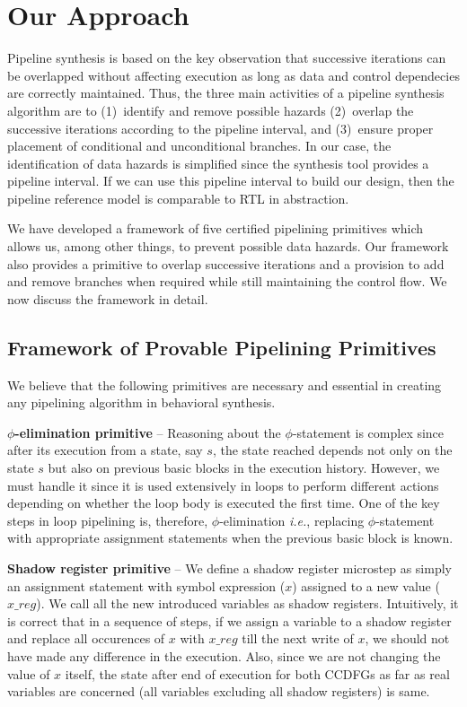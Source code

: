 \section{Our Approach}
\label{sec:pipelining-algorithm}

Pipeline synthesis is based on the key observation that
successive iterations can be overlapped without affecting execution as long
as data and control dependecies are correctly maintained. 
Thus, the three main
activities of a pipeline synthesis algorithm are to
(1)~identify and remove possible hazards (2)~overlap the
successive iterations according to the pipeline interval, and 
(3)~ensure proper placement of conditional and unconditional branches. In our case,
the identification of data hazards is simplified since the synthesis tool
provides a pipeline interval. If we can use this pipeline interval to build our design, 
then the pipeline reference model is comparable to RTL in abstraction. 

We have developed a framework of five certified pipelining
primitives which allows us, among other things, to prevent possible data
hazards. Our framework also provides a primitive
to overlap successive iterations and a provision to add and remove 
branches when required while still maintaining the control flow. We now discuss
the framework in detail.

\subsection{Framework of Provable Pipelining Primitives}

We believe that the following primitives are necessary and essential in creating any pipelining
algorithm in behavioral synthesis.

{\textbf {$\phi$-elimination primitive}} -- 
Reasoning about the $\phi$-statement is complex since after its
execution from a state, say $s$, the state reached depends not only
on the state $s$ but also on previous basic blocks in the execution history.
However, we must handle it since it is used extensively in
loops to perform different actions depending on whether the
loop body is executed the first time. One of the key steps in loop pipelining is,
therefore, $\phi$-elimination {\em i.e.}, replacing
$\phi$-statement with appropriate assignment statements when the previous basic block is known.

{\textbf {Shadow register primitive}} -- We define a shadow register microstep as simply an assignment
statement with symbol expression ($x$) assigned to a new value ($x\_reg$). We call all the new introduced 
variables as shadow registers. Intuitively, it is correct that in a sequence of steps, if we assign a variable 
to a shadow register and replace all occurences of $x$ with $x\_reg$
till the next write of $x$, we should
not have made any difference in the execution. Also, since we are not changing the value of $x$ itself, 
the state after end of execution for both CCDFGs as far as real variables are concerned (all variables
 excluding all shadow registers) is same. 

